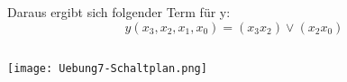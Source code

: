 \documentclass[10pt,a4paper,oneside,ngerman,numbers=noenddot]{scrartcl}
\begin{document}
Daraus ergibt sich folgender Term für y:
\begin{equation*}
y(x_{3},x_{2},x_{1},x_{0}) = (x_{3}x_{2}) \vee (x_{2}x_{0})
\end{equation*}

\subsection{} %
\texttt{[image: Uebung7-Schaltplan.png]}
\\\\\\\\\\\\\\\\\\\\\\\\
\end{document}
